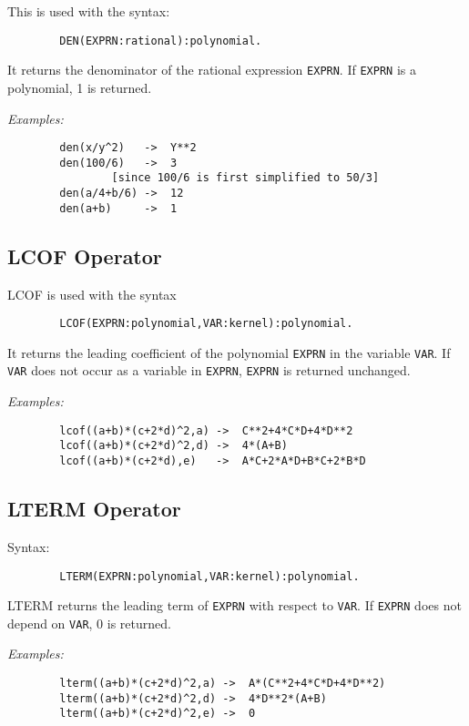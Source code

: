 This is used with the syntax:
\begin{verbatim}
        DEN(EXPRN:rational):polynomial.
\end{verbatim}
It returns the denominator of the rational expression {\tt EXPRN}.  If
{\tt EXPRN} is a polynomial, 1 is returned.

{\it Examples:}
\begin{verbatim}
        den(x/y^2)   ->  Y**2
        den(100/6)   ->  3
                [since 100/6 is first simplified to 50/3]
        den(a/4+b/6) ->  12
        den(a+b)     ->  1
\end{verbatim}

\subsection{LCOF Operator}

LCOF is used with the syntax
\begin{verbatim}
        LCOF(EXPRN:polynomial,VAR:kernel):polynomial.
\end{verbatim}
It returns the leading coefficient of the
polynomial {\tt EXPRN} in the variable {\tt VAR}.  If {\tt VAR} does not
occur as a variable in {\tt EXPRN}, {\tt EXPRN} is returned unchanged.

{\it Examples:}
\begin{verbatim}
        lcof((a+b)*(c+2*d)^2,a) ->  C**2+4*C*D+4*D**2
        lcof((a+b)*(c+2*d)^2,d) ->  4*(A+B)
        lcof((a+b)*(c+2*d),e)   ->  A*C+2*A*D+B*C+2*B*D
\end{verbatim}

\subsection{LTERM Operator}

Syntax:
\begin{verbatim}
        LTERM(EXPRN:polynomial,VAR:kernel):polynomial.
\end{verbatim}
LTERM returns the leading term of {\tt EXPRN} with respect to {\tt VAR}.
If {\tt EXPRN} does not depend on {\tt VAR}, 0 is returned.

{\it Examples:}
\begin{verbatim}
        lterm((a+b)*(c+2*d)^2,a) ->  A*(C**2+4*C*D+4*D**2)
        lterm((a+b)*(c+2*d)^2,d) ->  4*D**2*(A+B)
        lterm((a+b)*(c+2*d)^2,e) ->  0
\end{verbatim}

